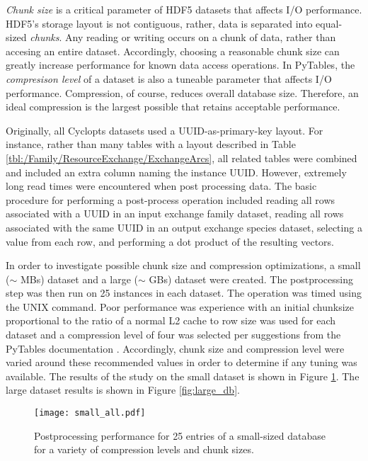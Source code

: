 \textit{Chunk size} is a critical parameter of HDF5 datasets that affects I/O
performance. HDF5's storage layout is not contiguous, rather, data is separated
into equal-sized \textit{chunks}. Any reading or writing occurs on a chunk of
data, rather than accesing an entire dataset. Accordingly, choosing a reasonable
chunk size can greatly increase performance for known data access operations. In
PyTables, the \textit{compresison level} of a dataset is also a tuneable
parameter that affects I/O performance. Compression, of course, reduces overall
database size. Therefore, an ideal compression is the largest possible that
retains acceptable performance.

Originally, all Cyclopts datasets used a UUID-as-primary-key layout. For
instance, rather than many tables with a layout described in Table
\ref{tbl:/Family/ResourceExchange/ExchangeArcs},
all related tables were combined and included an extra column naming the
instance UUID. However, extremely long read times were encountered when post
processing data. The basic procedure for performing a post-process operation
included reading all rows associated with a UUID in an input exchange family
dataset, reading all rows associated with the same UUID in an output exchange
species dataset, selecting a value from each row, and performing a dot product
of the resulting vectors.

In order to investigate possible chunk size and compression optimizations, a
small ($\sim$ MBs) dataset and a large ($\sim$ GBs) dataset were created. The
postprocessing step was then run on 25 instances in each dataset. The operation
was timed using the UNIX  command. Poor performance was experience
with an initial chunksize proportional to the ratio of a normal L2 cache to row
size was used for each dataset and a compression level of four was selected per
suggestions from the PyTables documentation \cite{tablesopt}. Accordingly, chunk
size and compression level were varied around these recommended values in order
to determine if any tuning was available. The results of the study on the small
dataset is shown in Figure \ref{fig:small_db}. The large dataset results is
shown in Figure \ref{fig:large_db}.

\begin{figure}
  \begin{center}
    \texttt{[image: small\_all.pdf]}
    \caption[]{
      \label{fig:small_db}
      Postprocessing performance for 25 entries of a small-sized database for a 
      variety of compression levels and chunk sizes.}
  \end{center}
\end{figure}

